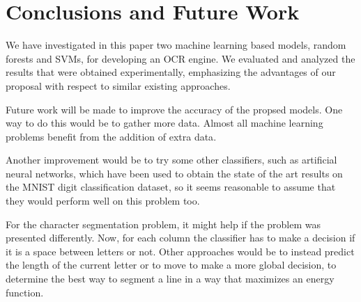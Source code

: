 \section{Conclusions and Future Work}
\label{ref:concl}
We have investigated in this paper two machine learning based models, random forests and SVMs, for developing an OCR engine. We evaluated and analyzed the results that were obtained experimentally, emphasizing the advantages of our proposal with respect to similar existing approaches. 

Future work will be made to improve the accuracy of the propsed models. One way to do this would be to gather more data. Almost all machine learning problems benefit from the addition of extra data\cite{halevy2009unreasonable}.

Another improvement would be to try some other classifiers, such as artificial neural networks, which have been used to obtain the state of the art results on the MNIST digit classification dataset, so it seems reasonable to assume that they would perform well on this problem too. 

For the character segmentation problem, it might help if the problem was presented differently. Now, for each column the classifier has to make a decision if it is a space between letters or not. Other approaches would be to instead predict the length of the current letter or to move to make a more global decision, to determine the best way to segment a line in a way that maximizes an energy function.